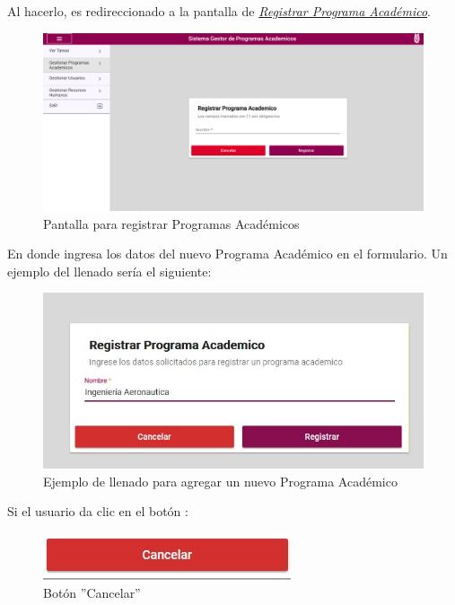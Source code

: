             Al hacerlo, es redireccionado a la pantalla de \hyperlink{registrarpa}{\textit{Registrar Programa Académico}}.

        \begin{figure}[H]
            \centering
            \hypertarget{registrarpa}{\includegraphics[width=0.7\linewidth]{images/SP3/RegistrarPA}}
            \caption{Pantalla para registrar Programas Académicos}
            \label{registrarpa}
        \end{figure}

        En donde ingresa los datos del nuevo Programa Académico en el formulario. Un ejemplo del llenado sería el siguiente:

        \begin{figure}[H]
            \centering
            \hypertarget{ejreg}{\includegraphics[width=0.7\linewidth]{images/SP3/Llenado}}
            \caption{Ejemplo de llenado para agregar un nuevo Programa Académico}
            \label{ejreg}
        \end{figure}

        Si el usuario da clic en el botón :

        \begin{figure}[H]
            \centering
            \hypertarget{cancel1}{\includegraphics[width=0.7\linewidth]{images/SP3/BtnCancelar}}
            \caption{Botón ''Cancelar''}
            \label{cancel1}
        \end{figure}

